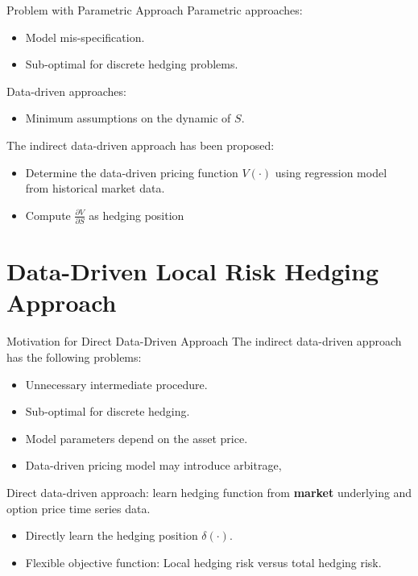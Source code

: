 \documentclass[10pt,table,mathserif]{beamer}
\begin{document}
\begin{frame}{Problem with Parametric Approach}
Parametric approaches:
\begin{itemize}
	\item Model mis-specification.
	\item Sub-optimal for discrete hedging problems.
\end{itemize}

Data-driven approaches:
\begin{itemize}
	\item Minimum assumptions on the dynamic of $S$.
\end{itemize}

The indirect data-driven approach has been proposed:
\begin{itemize}
	\item Determine the data-driven pricing function $V(\cdot)$ using regression model from historical market data.
	\item Compute $\frac{ \partial V}{ \partial S}$ as hedging position
\end{itemize}
\end{frame}


\section{Data-Driven Local Risk Hedging Approach}
\begin{frame}{Motivation for Direct Data-Driven Approach}
The indirect data-driven approach has the following problems:
\begin{itemize}
  \item Unnecessary intermediate procedure.
  \item Sub-optimal for discrete hedging.
  \item Model parameters depend on the asset price.
  \item Data-driven pricing model may introduce arbitrage, 
\end{itemize}
\vspace{0.3cm}
Direct data-driven approach: learn hedging function from \textbf{market} underlying and option  price time series data.
\begin{itemize}
  \item Directly learn the hedging position $\delta(\cdot)$.
  \item Flexible objective function: Local hedging risk versus total hedging risk.
\end{itemize}
\end{frame}
\end{document}

